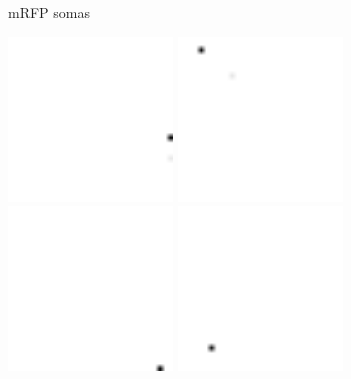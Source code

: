 \begin{figure}
\begin{subfigure}[b]{0.3\textwidth}
		\caption{mRFP somas}
		\label{fig:mrfp_somas}
	\end{subfigure}
	\quad%
	\begin{subfigure}[b]{0.3\textwidth}
		\includegraphics[width=0.48\textwidth]{tdTomato_1}
		\includegraphics[width=0.48\textwidth]{tdTomato_2} \\[2pt]
		\includegraphics[width=0.48\textwidth]{tdTomato_3}
		\includegraphics[width=0.48\textwidth]{tdTomato_4}

\end{subfigure}
\end{figure}

